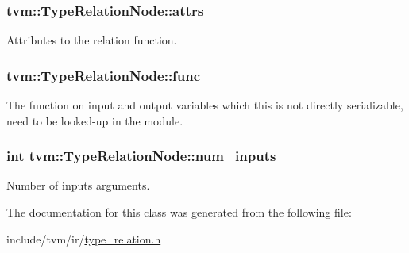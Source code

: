 \subsubsection[{\texorpdfstring{attrs}{attrs}}]{ tvm\+::\+Type\+Relation\+Node\+::attrs}\hypertarget{classtvm_1_1TypeRelationNode_a4398ffaf2402c479157ca5cbf05c5a7e}{}\label{classtvm_1_1TypeRelationNode_a4398ffaf2402c479157ca5cbf05c5a7e}


Attributes to the relation function. 

\subsubsection[{\texorpdfstring{func}{func}}]{ tvm\+::\+Type\+Relation\+Node\+::func}\hypertarget{classtvm_1_1TypeRelationNode_a2f243e89c5f192eb8c006313fa0c7c5a}{}\label{classtvm_1_1TypeRelationNode_a2f243e89c5f192eb8c006313fa0c7c5a}


The function on input and output variables which this is not directly serializable, need to be looked-\/up in the module. 

\subsubsection[{\texorpdfstring{num\+\_\+inputs}{num_inputs}}]{\setlength{\rightskip}{0pt plus 5cm}int tvm\+::\+Type\+Relation\+Node\+::num\+\_\+inputs}\hypertarget{classtvm_1_1TypeRelationNode_aacb622dd257962ccb4ddfca4c89e09b4}{}\label{classtvm_1_1TypeRelationNode_aacb622dd257962ccb4ddfca4c89e09b4}


Number of inputs arguments. 



The documentation for this class was generated from the following file\+:\begin{DoxyCompactItemize}
\item 
include/tvm/ir/\hyperlink{type__relation_8h}{type\+\_\+relation.\+h}\end{DoxyCompactItemize}
